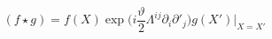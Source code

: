 \begin{equation}\label{eq270:ps}
	(f\star g)=f(X)\exp\Big(i\frac{\vartheta}{2}\Lambda^{ij}\partial_{i}\partial'_{j}\Big)g(X')\Big\vert_{X=X'}
\end{equation}

